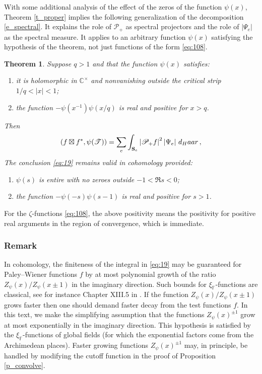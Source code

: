 \documentclass[14pt]{extarticle}
\newcommand{\Ct}{\mathbb{C}^\times}
\newcommand{\F}{\mathbb{F}}
\newcommand{\cT}{\mathscr{T}}
\newcommand{\cP}{\mathscr{P}}
\newcommand{\bbS}{\mathbf{S}}
\newtheorem{Theorem}{Theorem}
\theoremstyle{definition}
\begin{document}
With some additional analysis of the effect of the zeros of the
function $\psi(x)$, Theorem \ref{t_proper} implies
the following generalization of the 
decomposition \eqref{e_spectral}. It explains
the role of $\cP_+$ as spectral projectors and the role
of $\left|\Psi_e\right|$ as the spectral measure. It applies
to an arbitrary function $\psi(x)$ satisfying the hypothesis
of the theorem, not just functions of the form \eqref{eq:108}. 

\begin{Theorem}\label{t_L2} 
  Suppose $q>1$ and that the function $\psi(x)$ satisfies:
  \begin{enumerate}
  \item[(1)] it is holomorphic
  in $\Ct$ and nonvanishing outside the critical strip $1/q<|x|<1$; 
  \item[(2)] the function $- \psi(x^{-1}) \psi(x/q)$ is real and positive 
    for $x> q$.  
  \end{enumerate}
Then 
  \begin{equation}
    \label{eq:19}
    \left(f \boxtimes f^*, \psi(\cT)\right) =
      \sum_{e} 
    \int_{\bbS_e} \left| \cP_+ f \right|^2 
    \left|\Psi_e \right|\, 
      d_\textup{Haar}  \,, 
    \end{equation}
    The conclusion \eqref{eq:19} remains valid in cohomology provided: 
\begin{enumerate}
  \item[(1$'$)] $\psi(s)$ is entire with no zeroes outside $-1 < \Re s
    <0$; 
  \item[(2$'$)] the function $-\psi(-s) \psi(s-1)$ is real and positive 
    for $s>1$.  
  \end{enumerate}
  \end{Theorem}

  For the $\zeta$-functions \eqref{eq:108}, the above positivity
  means the positivity for positive real arguments in the region of
  convergence, which is immediate.

  \subsubsection{Remark}
\label{sec:remark_growth}



  In cohomology, the finiteness of the integral in \eqref{eq:19} may
  be guaranteed for Paley--Wiener functions $f$ by at most polynomial
  growth of the ratio $Z_\psi(x)/Z_\psi(x\pm 1)$ in the imaginary
  direction. Such bounds for $\xi_\F$-functions are classical, see for
  instance Chapter XIII.5 in \cite{Lang}. If the function
  $Z_\psi(x)/Z_\psi(x\pm 1)$ grows faster then one should
  demand faster decay from the test functions $f$. In this text, 
  we make the simplifying assumption that the functions
  $Z_\psi(x)^{\pm 1}$ grow at most
  exponentially in the imaginary direction. This hypothesis is
  satisfied by the $\xi_\F$-functions of global fields (for which the exponential
  factors come from the Archimedean places). Faster growing
  functions $Z_\psi(x)^{\pm 1}$ may, in principle, be handled by modifying the
  cutoff function in the proof of Proposition \ref{p_convolve}. 
\end{document}
